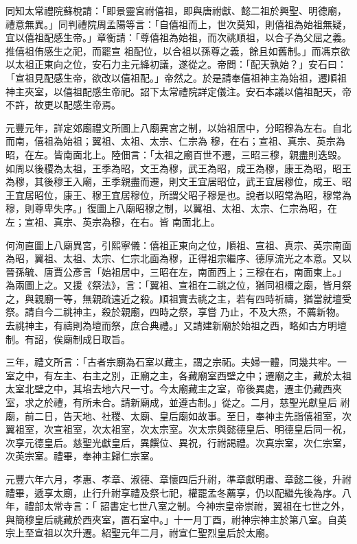 \begin{pinyinscope}
 同知太常禮院蘇梲請：「即景靈宮祔僖祖，即與唐祔獻、懿二祖於興聖、明德廟，禮意無異。」同判禮院周孟陽等言：「自僖祖而上，世次莫知，則僖祖為始祖無疑，宜以僖祖配感生帝。」章衡請：「尊僖祖為始祖，而次祧順祖，以合子為父屈之義。推僖祖侑感生之祀，而罷宣
 祖配位，以合祖以孫尊之義，餘且如舊制。」而馮京欲以太祖正東向之位，安石力主元絳初議，遂從之。帝問：「配天孰始？」安石曰：「宣祖見配感生帝，欲改以僖祖配。」帝然之。於是請奉僖祖神主為始祖，遷順祖神主夾室，以僖祖配感生帝祀。詔下太常禮院詳定儀注。安石本議以僖祖配天，帝不許，故更以配感生帝焉。



 元豐元年，詳定郊廟禮文所圖上八廟異宮之制，以始祖居中，分昭穆為左右。自北而南，僖祖為始祖；翼祖、太祖、太宗、仁宗為
 穆，在右；宣祖、真宗、英宗為昭，在左。皆南面北上。陸佃言：「太祖之廟百世不遷，三昭三穆，親盡則迭毀。如周以後稷為太祖，王季為昭，文王為穆，武王為昭，成王為穆，康王為昭，昭王為穆，其後穆王入廟，王季親盡而遷，則文王宜居昭位，武王宜居穆位，成王、昭王宜居昭位，康王、穆王宜居穆位，所謂父昭子穆是也。說者以昭常為昭，穆常為穆，則尊卑失序。」復圖上八廟昭穆之制，以翼祖、太祖、太宗、仁宗為昭，在左；宣祖、真宗、英宗為穆，在右。皆
 南面北上。



 何洵直圖上八廟異宮，引熙寧儀：僖祖正東向之位，順祖、宣祖、真宗、英宗南面為昭，翼祖、太祖、太宗、仁宗北面為穆，正得祖宗繼序、德厚流光之本意。又以晉孫毓、唐賈公彥言「始祖居中，三昭在左，南面西上；三穆在右，南面東上。」為兩圖上之。又援《祭法》，言：「翼祖、宣祖在二祧之位，猶同祖檷之廟，皆月祭之，與親廟一等，無親疏遠近之殺。順祖實去祧之主，若有四時祈禱，猶當就壇受祭。請自今二祧神主，殺於親廟，四時之祭，享嘗
 乃止，不及大烝，不薦新物。去祧神主，有禱則為壇而祭，庶合典禮。」又請建新廟於始祖之西，略如古方明壇制。有詔，俟廟制成日取旨。



 三年，禮文所言：「古者宗廟為石室以藏主，謂之宗祏。夫婦一體，同幾共牢。一室之中，有左主、右主之別，正廟之主，各藏廟室西壁之中；遷廟之主，藏於太祖太室北壁之中，其埳去地六尺一寸。今太廟藏主之室，帝後異處，遷主仍藏西夾室，求之於禮，有所未合。請新廟成，並遵古制。」從之。二月，慈聖光獻皇后
 祔廟，前二日，告天地、社稷、太廟、皇后廟如故事。至日，奉神主先詣僖祖室，次翼祖室，次宣祖室，次太祖室，次太宗室。次太宗與懿德皇后、明德皇后同一祝，次享元德皇后。慈聖光獻皇后，異饌位、異祝，行祔謁禮。次真宗室，次仁宗室，次英宗室。禮畢，奉神主歸仁宗室。



 元豐六年六月，孝惠、孝章、淑德、章懷四后升祔，準章獻明肅、章懿二後，升祔禮畢，遞享太廟，止行升祔享禮及祭七祀，權罷孟冬薦享，仍以配繼先後為序。八年，禮部太常寺言：「
 詔書定七世八室之制。今神宗皇帝崇祔，翼祖在七世之外，與簡穆皇后祧藏於西夾室，置石室中。」十一月丁酉，祔神宗神主於第八室。自英宗上至宣祖以次升遷。紹聖元年二月，祔宣仁聖烈皇后於太廟。




\end{pinyinscope}
